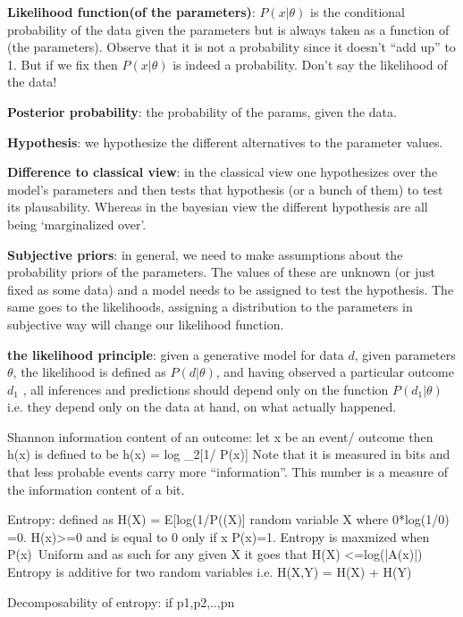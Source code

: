 \textbf{Likelihood function(of the parameters)}: $P(x|\theta)$ is the conditional probability of the data given the parameters but is always taken as a function of \theta (the parameters). Observe that it is not a probability since it doesn't “add up” to 1. But if we fix \theta then $P(x|\theta)$ is indeed a probability. 
Don’t say the likelihood of the data!

\textbf{Posterior probability}: the probability of the params, given the data.

\textbf{Hypothesis}: we hypothesize the different alternatives to the parameter values. 

\textbf{Difference to classical view}: in the classical view one hypothesizes over the model’s parameters and then tests that hypothesis (or a bunch of them) to test its plausability. Whereas in the bayesian view the different hypothesis are all being ‘marginalized over’.

\textbf{Subjective priors}: in general, we need to make assumptions about the probability priors of the parameters. The values of these are unknown (or just fixed as some data) and a model needs to be assigned to test the hypothesis. The same goes to the likelihoods, assigning a distribution to the parameters in subjective way will change our likelihood function.

\textbf{the likelihood principle}: given a generative model for data $d$, given parameters $\theta$, the likelihood is defined as $P (d | \theta)$, and having observed a particular outcome $d_1$ , all inferences and predictions should depend only on the function $P(d_1 | \theta)$ i.e. they depend only on the data at hand, on what actually happened. 

Shannon information content of an outcome: let x be an event/ outcome then h(x) is defined to be h(x) = log _2[1/ P(x)]
Note that it is measured in bits and that less probable events carry more “information”.
This number is a measure of the information content of a bit. 

Entropy: defined as H(X) =  E[log(1/P((X)] random variable X where 0*log(1/0) =0. H(x)>=0 and is equal to 0 only if x P(x)=1. 
Entropy is maxmized when P(x)~Uniform and as such for any given X it goes that H(X) <=log(|A(x)|)
Entropy is additive for two random variables i.e. H(X,Y) = H(X) + H(Y)

Decomposability of entropy:  if {p1,p2,..,pn}


